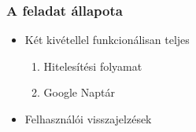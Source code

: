 \documentclass[12pt]{beamer}
\begin{document}
\begin{frame}
    \frametitle{A feladat állapota}
    
    \Large
    \begin{itemize}
        \item Két kivétellel funkcionálisan teljes
        \begin{enumerate}
            \large
            \item Hitelesítési folyamat
            \item Google Naptár
        \end{enumerate}
        \Large
        \item Felhasználói visszajelzések
    \end{itemize}
\end{frame}
\end{document}
